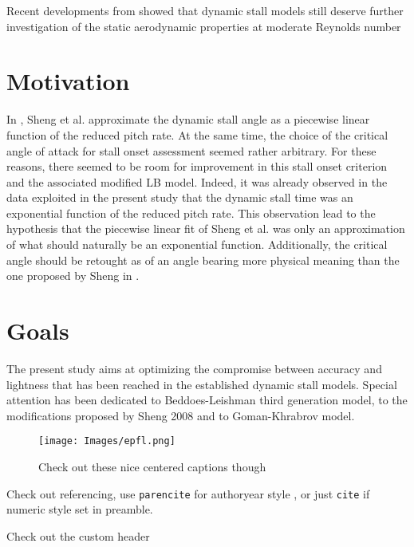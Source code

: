 Recent developments from \cite{tank_possibility_2017} showed that dynamic stall models still deserve further investigation of the static aerodynamic properties at moderate Reynolds number

\section{Motivation}

In \cite{sheng_modified_2008}, Sheng et al. approximate the dynamic stall angle as a piecewise linear function of the reduced pitch rate. At the same time, the choice of the critical angle of attack for stall onset assessment seemed rather arbitrary. For these reasons, there seemed to be room for improvement in this stall onset criterion and the associated modified LB model. 
Indeed, it was already observed in the data exploited in the present study that the dynamic stall time was an exponential function of the reduced pitch rate. This observation lead to the hypothesis that the piecewise linear fit of Sheng et al. was only an approximation of what should naturally be an exponential function. Additionally, the critical angle should be retought as of an angle bearing more physical meaning than the one proposed by Sheng in \cite{sheng_modified_2008}.
\section{Goals}

The present study aims at optimizing the compromise between accuracy and lightness that has been reached in the established dynamic stall models. Special attention has been dedicated to Beddoes-Leishman third generation model, to the modifications proposed by Sheng 2008 and to Goman-Khrabrov model. 

\begin{wrapfigure}{r}{5cm} %
    \centering
    \texttt{[image: Images/epfl.png]}
    \caption{Check out these nice centered captions though}
    \label{fig:my_label}
\end{wrapfigure}

Check out referencing, use \texttt{parencite} for authoryear style \parencite{reflabel}, or just \texttt{cite} if numeric style set in preamble.

\begin{invsummary}
Check out the custom header
\end{invsummary}